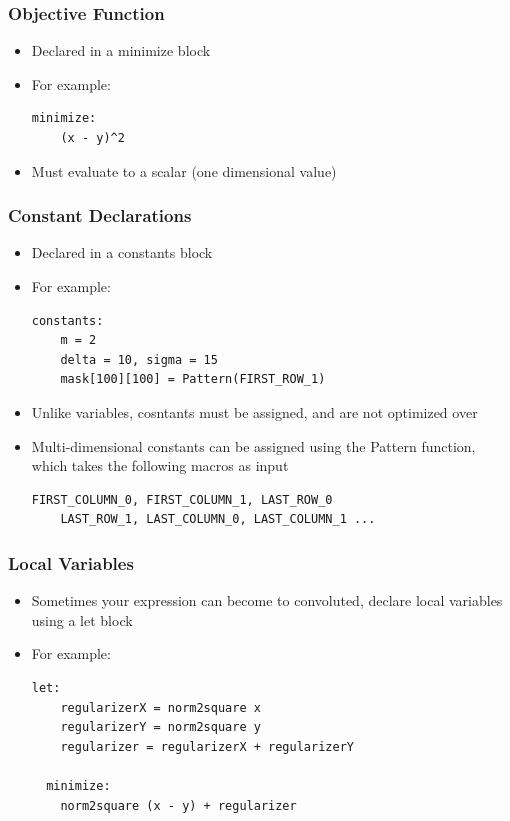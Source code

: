 \documentclass[presentation]{beamer}
\begin{document}
\begin{frame}[fragile]
  \frametitle{Objective Function}

  \begin{itemize}
  \item Declared in a {\color{red} minimize} block
  \item For example:
  \begin{lstlisting}[style=Haskell]
  minimize:
    (x - y)^2
  \end{lstlisting}
  \item Must evaluate to a scalar (one dimensional value)
  \end{itemize}
\end{frame}

\begin{frame}[fragile]
  \frametitle{Constant Declarations}

  \begin{itemize}
  \item Declared in a {\color{red} constants} block
  \item For example:
  \begin{lstlisting}[style=Haskell]
  constants:
    m = 2
    delta = 10, sigma = 15
    mask[100][100] = Pattern(FIRST_ROW_1)
  \end{lstlisting}
  \item Unlike variables, cosntants must be assigned, and are not optimized over
  \item Multi-dimensional constants can be assigned using the Pattern function,
    which takes the following macros as input
  \begin{lstlisting}[style=CStyle]
    FIRST_COLUMN_0, FIRST_COLUMN_1, LAST_ROW_0
    LAST_ROW_1, LAST_COLUMN_0, LAST_COLUMN_1 ...
  \end{lstlisting}
  \end{itemize}
\end{frame}

\begin{frame}[fragile]
  \frametitle{Local Variables}

  \begin{itemize}
    \item Sometimes your expression can become to convoluted, declare local
      variables using a {\color{red}let} block
    \item For example:
  \begin{lstlisting}[style=Haskell]
  let:
    regularizerX = norm2square x
    regularizerY = norm2square y
    regularizer = regularizerX + regularizerY

  minimize:
    norm2square (x - y) + regularizer      
  \end{lstlisting}
  \end{itemize}
\end{frame}
\end{document}
